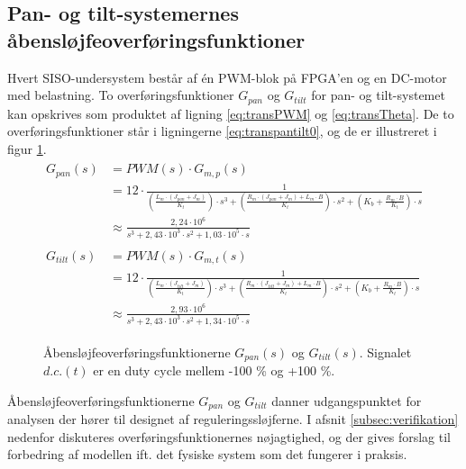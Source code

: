 \subsection{Pan- og tilt-systemernes åbensløjfeoverføringsfunktioner}
Hvert SISO-undersystem består af én PWM-blok på FPGA'en og en DC-motor med belastning.
To overføringsfunktioner \(G_{pan}\) og \(G_{tilt}\) for pan- og tilt-systemet kan opskrives
som produktet af ligning \ref{eq:transPWM} og \ref{eq:transTheta}. De to overføringsfunktioner
står i ligningerne \ref{eq:transpantilt0}, og de er illustreret i figur \ref{fig:openloop1}.
\begin{align}
\label{eq:transpantilt0}
\begin{split}
	G_{pan}\left(s\right)&=PWM\left(s\right)\cdot{}G_{m,p}\left(s\right)\\
	&=12\cdot{}\frac{1}
			{\left(\frac{L_m\cdot{}\left(J_{pan}+J_m\right)}{K_t}\right)\cdot{}s^3
			+\left(\frac{R_m\cdot{}\left(J_{pan}+J_m\right)+L_m\cdot{}B}{K_t}\right)\cdot{}s^2
			+\left(K_b+\frac{R_m\cdot{}B}{K_t}\right)\cdot{}s}\\
	&\approx\frac{2,24\cdot{}10^6}{s^3 + 2,43\cdot{}10^3 \cdot{} s^2 + 1,03\cdot{}10^5\cdot{}s}
	\\
	\\
	G_{tilt}\left(s\right)&=PWM\left(s\right)\cdot{}G_{m,t}\left(s\right)\\
	&=12\cdot{}\frac{1}
			{\left(\frac{L_m\cdot{}\left(J_{tilt}+J_m\right)}{K_t}\right)\cdot{}s^3
			+\left(\frac{R_m\cdot{}\left(J_{tilt}+J_m\right)+L_m\cdot{}B}{K_t}\right)\cdot{}s^2
			+\left(K_b+\frac{R_m\cdot{}B}{K_t}\right)\cdot{}s}\\
	&\approx\frac{2,93\cdot{}10^6}{s^3 + 2,43\cdot{}10^3 \cdot{} s^2 + 1,34\cdot{}10^5\cdot{}s}
\end{split}
\end{align}
\begin{figure}[!th]
\centering
\begin{tikzpicture}[auto, node distance=2.6cm,>=latex']

\end{tikzpicture}
\caption[Åbensløjfeoverføringsfunktioner]{Åbensløjfeoverføringsfunktionerne \(G_{pan}\left(s\right)\) og \(G_{tilt}\left(s\right)\).
	Signalet \(d.c.\left(t\right)\) er en duty cycle mellem -100 \% og +100 \%.}
\label{fig:openloop1}
\end{figure}

Åbensløjfeoverføringsfunktionerne \(G_{pan}\) og \(G_{tilt}\) danner udgangspunktet
for analysen der hører til designet af reguleringssløjferne.
I afsnit \ref{subsec:verifikation} nedenfor diskuteres overføringsfunktionernes nøjagtighed,
og der gives forslag til forbedring af modellen ift. det fysiske system som det fungerer
i praksis.

